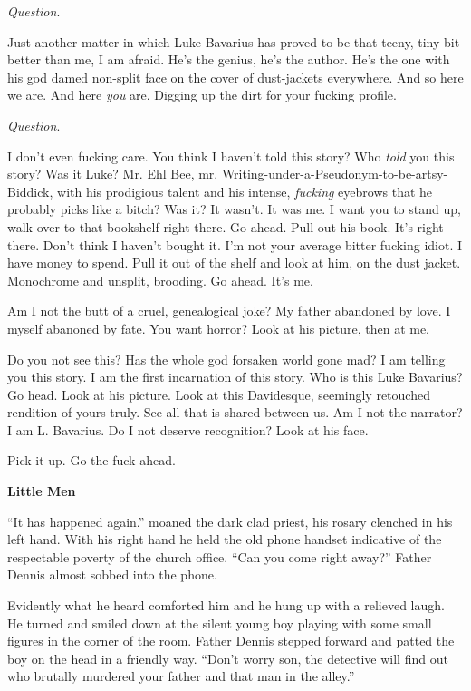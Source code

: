 {\em Question}.



Just another matter in which Luke Bavarius has proved to be that
teeny, tiny bit better than me, I am afraid. He's the genius,
he's the author. He's the one with his god damed
non-split face on the cover of dust-jackets everywhere. And so here
we are. And here {\em you} are. Digging up the dirt for your
fucking profile.



{\em Question}.



I don't even fucking care. You think I haven't told
this story? Who {\em told} you this story? Was it Luke? Mr. Ehl
Bee, mr. Writing-under-a-Pseudonym-to-be-artsy-Biddick, with his
prodigious talent and his intense, {\em fucking} eyebrows that he
probably picks like a bitch? Was it? It wasn't. It was me. I
want you to stand up, walk over to that bookshelf right there. Go
ahead. Pull out his book. It's right there. Don't think
I haven't bought it. I'm not your average bitter fucking
idiot. I have money to spend. Pull it out of the shelf and look at
him, on the dust jacket. Monochrome and unsplit, brooding. Go
ahead. It's me.

Am I not the butt of a cruel, genealogical joke? My father
abandoned by love. I myself abanoned by fate. You want horror? Look
at his picture, then at me.

Do you not see this? Has the whole god forsaken world gone mad? I
am telling you this story. I am the first incarnation of this
story. Who is this Luke Bavarius? Go head. Look at his picture.
Look at this Davidesque, seemingly retouched rendition of yours
truly. See all that is shared between us. Am I not the narrator? I
am L. Bavarius. Do I not deserve recognition? Look at his
face.

Pick it up. Go the fuck ahead. 
 





{\bf Little Men}



``It has happened again.'' moaned the dark clad priest, his rosary
clenched in his left hand. With his right hand he held the old
phone handset indicative of the respectable poverty of the church
office. ``Can you come right away?'' Father Dennis almost sobbed into
the phone.

Evidently what he heard comforted him and he hung up with a
relieved laugh. He turned and smiled down at the silent young boy
playing with some small figures in the corner of the room. Father
Dennis stepped forward and patted the boy on the head in a friendly
way. ``Don't worry son, the detective will find out who brutally
murdered your father and that man in the alley.''


